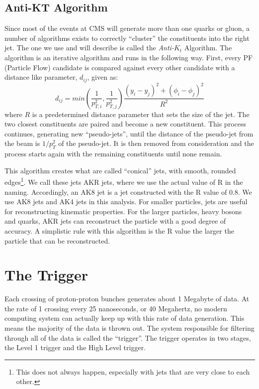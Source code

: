 \subsection{Anti-KT Algorithm}

Since most of the events at CMS will generate more than one quarks or gluon, a number of algorithms exists to correctly ``cluster'' the constituents into the right jet.
The one we use and will describe is called the \textit{Anti-$K_t$} Algorithm. The algorithm is an iterative algorithm and runs in the following way.
First, every PF (Particle Flow) candidate is compared against every other candidate with a distance like parameter, $d_{ij}$, given as:
\begin{equation}
   d_{ij} = min(\frac{1}{p_{T,i}^2},\frac{1}{p_{T,j}^2}) \frac{(y_i - y_j)^2+(\phi_i - \phi_j)^2}{R^2}
\end{equation}
where $R$ is a predetermined distance parameter that sets the size of the jet. The two closest constituents are paired and become a new constituent.
This process continues, generating new ``pseudo-jets'', until the distance of the pseudo-jet from the beam is $1/p_T^2$ of the pseudo-jet. It is then removed from consideration and the process starts again with the remaining constituents until none remain.

This algorithm creates what are called ``conical'' jets, with smooth, rounded edges\footnote{This does not always happen, especially with jets that are very close to each other.}.
We call these jets AKR jets, where we use the actual value of R in the naming. Accordingly, an AK8 jet is a jet constructed with the R value of 0.8.
We use AK8 jets and AK4 jets in this analysis. For smaller particles, jets are useful for reconstructing kinematic properties. 
For the larger particles, heavy bosons and quarks, AKR jets can reconstruct the particle with a good degree of accuracy. A simplistic rule with this algorithm is the R value the larger the particle that can be reconstructed.

\section{The Trigger}

Each crossing of proton-proton bunches generates about 1 Megabyte of data. At the rate of 1 crossing every 25 nanoseconds, or 40 Megahertz, no modern computing system can actually keep up with this rate of data generation. 
This means the majority of the data is thrown out. The system responsible for filtering through all of the data is called the ``trigger''.
The trigger operates in two stages, the Level 1 trigger and the High Level trigger. 

